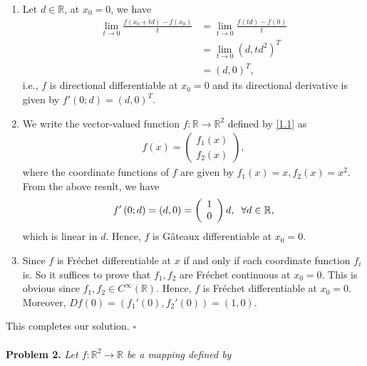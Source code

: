 \documentclass[a4paper]{article}
\numberwithin{equation}{section}
\begin{document}
\begin{enumerate}
\item Let $d\in \mathbb{R}$, at $x_0 =0$, we have
\begin{align}
\mathop {\lim }\limits_{t \to 0} \frac{{f\left( {{x_0} + td} \right) - f\left( {{x_0}} \right)}}{t} &= \mathop {\lim }\limits_{t \to 0} \frac{{f\left( {td} \right) - f\left( 0 \right)}}{t}\\
& = \mathop {\lim }\limits_{t \to 0} {\left( {d,t{d^2}} \right)^T}\\
& = {\left( {d,0} \right)^T},
\end{align}
i.e., $f$ is directional differentiable at $x_0=0$ and its directional derivative is given by $f'\left( {0;d} \right) = \left( {d,0} \right)^T$.
\item We write the vector-valued function $f:\mathbb{R} \to {\mathbb{R}^2}$ defined by \eqref{1.1} as
\begin{align}
f\left( x \right) = \left( {\begin{array}{*{20}{c}}
{{f_1}\left( x \right)}\\
{{f_2}\left( x \right)}
\end{array}} \right),
\end{align}
where the coordinate functions of $f$ are given by $f_1\left(x\right)=x,f_2\left(x\right)=x^2$. From the above result, we have
\begin{align}
f'\left( {0;d} \right) = \left( {d,0} \right) = \left( {\begin{array}{*{20}{c}}
1\\
0
\end{array}} \right)d ,\hspace{0.2cm} \forall d\in \mathbb{R},
\end{align}
which is linear in $d$. Hence, $f$ is G\^{a}teaux differentiable at $x_0=0$. 
\item Since $f$ is Fr\'{e}chet differentiable at $x$ if and only if each coordinate function $f_i$ is. So it suffices to prove that $f_1,f_2$ are Fr\'{e}chet continuous at $x_0=0$. This is obvious since $f_1,f_2 \in C^{\infty}\left(\mathbb{R}\right)$. Hence, $f$ is Fr\'{e}chet differentiable at $x_0=0$. Moreover, $Df\left( 0 \right) = \left( {{f_1}'\left( 0 \right),{f_2}'\left( 0 \right)} \right) = \left( {1,0} \right)$.
\end{enumerate}
This completes our solution. \hfill $\square$\\
\\
\textbf{Problem 2.} \textit{Let $f:\mathbb{R}^2\to \mathbb{R}$ be a mapping defined by}
\end{document}
